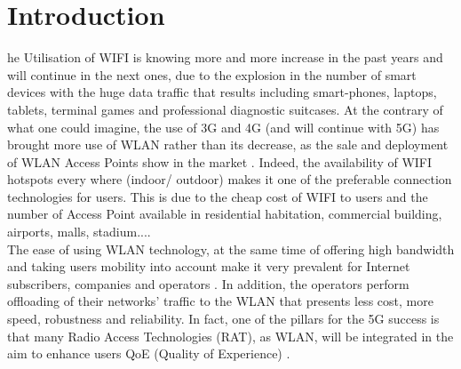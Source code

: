 \documentclass[journal,transmag]{IEEEtran}
\begin{document}
\maketitle

\IEEEdisplaynontitleabstractindextext

\IEEEpeerreviewmaketitle

\section{Introduction}
he Utilisation of WIFI is knowing more and more increase in the past years and will continue in the next ones, due to the explosion in the number of smart devices with the huge data traffic that results including smart-phones, laptops, tablets, terminal games and professional diagnostic suitcases. 
At the contrary of what one could imagine, the use of 3G and 4G (and will continue with 5G) has brought more use of WLAN rather than its decrease, as the sale and deployment of WLAN Access Points show in the market \cite{17why_Long_WIFI_Connect,14group_based_RRM}. Indeed, the availability of WIFI hotspots every where (indoor/ outdoor) makes it one of the preferable connection technologies for users. This is due to the cheap cost of WIFI to users and the number of Access Point available in residential habitation, commercial building, airports, malls, stadium...\cite{15Node_throughput_enhencement_wifi}. \\

The ease of using WLAN technology, at the same time of offering high bandwidth and taking users mobility into account make it very prevalent for Internet subscribers, companies and operators \cite{16AP_association_optimisation_fairness}. In addition, the operators perform offloading of their networks' traffic to the WLAN that presents less cost, more speed, robustness and reliability. In fact, one of the pillars for the 5G success is that many Radio Access Technologies (RAT), as WLAN, will be integrated in the aim to enhance users QoE (Quality of Experience) \cite{17QOS_AP_selection}. \\
\end{document}
